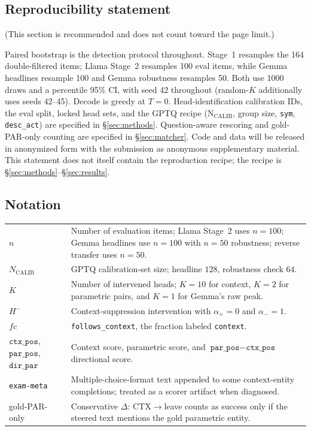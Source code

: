 \documentclass{article} %
\begin{document}
\subsection*{Reproducibility statement}

(This section is recommended and does not count toward the page limit.)

Paired bootstrap is the detection protocol throughout. Stage~1 resamples the 164 double-filtered items; Llama Stage~2 resamples 100 eval items, while Gemma headlines resample 100 and Gemma robustness resamples 50. Both use 1000 draws and a percentile 95\% CI, with seed 42 throughout (random-$K$ additionally uses seeds 42--45). Decode is greedy at $T{=}0$. Head-identification calibration IDs, the eval split, locked head sets, and the GPTQ recipe ($\mathrm{N_{CALIB}}$, group size, \texttt{sym}, \texttt{desc\_act}) are specified in \S\ref{sec:methods}. Question-aware rescoring and gold-PAR-only counting are specified in \S\ref{sec:matcher}. Code and data will be released in anonymized form with the submission as anonymous supplementary material. This statement does not itself contain the reproduction recipe; the recipe is \S\ref{sec:methods}--\S\ref{sec:results}.

\subsection*{Notation}
\begin{center}
\footnotesize
\begin{tabular}{p{0.95in}p{4.2in}}
\toprule
$n$ & Number of evaluation items; Llama Stage~2 uses $n{=}100$; Gemma headlines use $n{=}100$ with $n{=}50$ robustness; reverse transfer uses $n{=}50$. \\
$N_{\mathrm{CALIB}}$ & GPTQ calibration-set size; headline $128$, robustness check $64$. \\
$K$ & Number of intervened heads; $K{=}10$ for context, $K{=}2$ for parametric pairs, and $K{=}1$ for Gemma's raw peak. \\
$H^{-}$ & Context-suppression intervention with $\alpha_{+}{=}0$ and $\alpha_{-}{=}1$. \\
$fc$ & \texttt{follows\_context}, the fraction labeled \texttt{context}. \\
$\texttt{ctx\_pos}$, $\texttt{par\_pos}$, $\texttt{dir\_par}$ & Context score, parametric score, and $\texttt{par\_pos}-\texttt{ctx\_pos}$ directional score. \\
\texttt{exam-meta} & Multiple-choice-format text appended to some context-entity completions; treated as a scorer artifact when diagnosed. \\
gold-PAR-only & Conservative $\Delta$: CTX$\to$leave counts as success only if the steered text mentions the gold parametric entity. \\
\bottomrule
\end{tabular}
\end{center}
\end{document}
